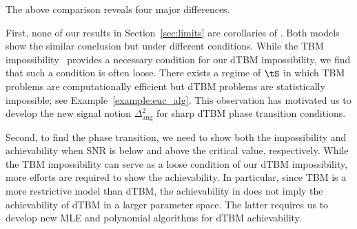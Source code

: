 \documentclass[lettersize,onecolumn,journal]{IEEEtran}
\theoremstyle{definition}
\theoremstyle{definition}
\begin{document}
{\begin{itemize}[wide]
{
\color{blue} The above comparison reveals four major differences. 
}    


First, none of our results in Section~\ref{sec:limits} are corollaries of \cite{han2020exact}. Both models show the similar conclusion but under different conditions. While the TBM impossibility~\citep{han2020exact} provides a necessary condition for our dTBM impossibility, we find that such a condition is often loose. There exists a regime of $\tS$ in which TBM problems are computationally efficient but dTBM problems are statistically impossible; see Example~\ref{example:euc_alg}. This observation has motivated us to develop the new signal notion $\Delta^2_{\text{ang}}$ for sharp dTBM phase transition conditions.  
     
 Second, to find the phase transition, we need to show both the impossibility and achievability when SNR is below and above the critical value, respectively. While the TBM impossibility can serve as a loose condition of our dTBM impossibility, more efforts are required to show the achievability. In particular, since TBM is a more restrictive model than dTBM, the achievability in \cite{han2020exact} does not imply the achievability of dTBM in a larger parameter space. The latter requires us to develop new MLE and polynomial algorithms for dTBM achievability.  %

    


\end{itemize}}
\end{document}
